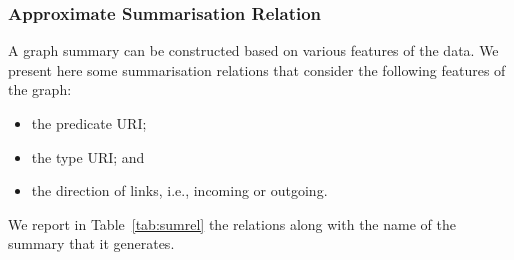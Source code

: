 \subsubsection{Approximate Summarisation Relation}

A graph summary can be constructed based on various features of the data. We present here some summarisation relations that consider the following features of the graph:
\begin{itemize}
	\item the predicate URI;
	\item the type URI; and
	\item the direction of links, i.e., incoming or outgoing.
\end{itemize}
We report in Table~\ref{tab:sumrel} the relations along with the name of the summary that it generates.


